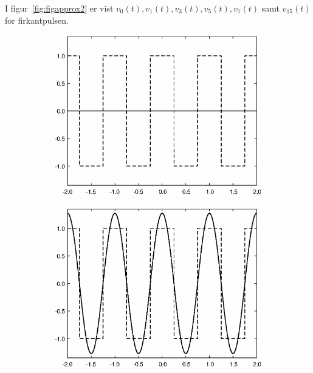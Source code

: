 \documentclass[11pt,a4paper]{article}
\begin{document}
I figur~\ref{fig:figapprox2} er vist $v_0(t), v_1(t), v_3(t), v_5(t), v_7(t)$ samt $v_{15}(t)$ for firkantpulsen.
\begin{figure}[htbp]
\centering
\begin{subfigure}{0.48\textwidth}
\includegraphics[scale=0.5]{approx2_000}
\end{subfigure}
\begin{subfigure}{0.48\textwidth}
\includegraphics[scale=0.5]{approx2_001}
\end{subfigure}
\begin{subfigure}{0.48\textwidth}

\end{subfigure}
\end{figure}
\end{document}
